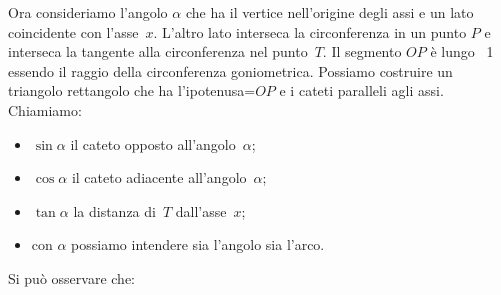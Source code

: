 \begin{minipage}{.49\textwidth}
Ora consideriamo l'angolo $\alpha$ che ha il vertice nell'origine degli 
assi e un lato coincidente con l'asse~$x$. L'altro lato interseca la 
circonferenza in un punto $P$ e interseca la tangente alla circonferenza 
nel punto~$T$.
Il segmento $OP$ è lungo ~1 essendo il raggio della circonferenza 
goniometrica.
Possiamo costruire un triangolo rettangolo che ha l'ipotenusa=$OP$ e i 
cateti paralleli agli assi. Chiamiamo:
\begin{itemize} [nosep]
 \item $\sin \alpha$ il cateto opposto all'angolo~$\alpha$;
 \item $\cos \alpha$ il cateto adiacente all'angolo~$\alpha$;
 \item $\tan \alpha$ la distanza di~$T$ dall'asse~$x$;
 \item con $\alpha$ possiamo intendere sia l'angolo sia l'arco.
\end{itemize}
\end{minipage}
\begin{minipage}{.49\textwidth}
  \begin{center}
\begin{inaccessibleblock}
    
\end{inaccessibleblock}
  \end{center}
\end{minipage}



\vspace{1em}

Si può osservare che:

